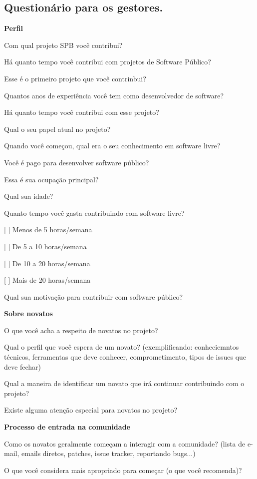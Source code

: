 \begin{anexosenv}
\chapter{Questionário para os gestores.}
\label{anexo e}

\textbf{Perfil}

Com qual projeto SPB você contribui?

Há quanto tempo você contribui com projetos de Software Público?

Esse é o primeiro projeto que você contrinbui?

Quantos anos de experiência você tem como desenvolvedor de software?

Há quanto tempo você contribui com esse projeto?

Qual o seu papel atual no projeto?

Quando você começou, qual era o seu conhecimento em software livre?

Você é pago para desenvolver software público?

Essa é sua ocupação principal?

Qual sua idade?

Quanto tempo você gasta contribuindo com software livre?

[ ] Menos de 5 horas/semana 

[ ] De 5 a 10 horas/semana

[ ] De 10 a 20 horas/semana

[ ] Mais de 20 horas/semana

Qual sua motivação para contribuir com software público?

\textbf{Sobre novatos}

O que você acha a respeito de novatos no projeto?

Qual o perfil que você espera de um novato? (exemplificando: conheciemntos técnicos, 
ferramentas que deve conhecer, comprometimento, tipos de issues que deve fechar)

Qual a maneira de identificar um novato que irá continuar contribuindo com o projeto?

Existe alguma atenção especial para novatos no projeto?

\textbf{Processo de entrada na comunidade}

Como os novatos geralmente começam a interagir com a comunidade? (lista de e-mail, 
emails diretos, patches, issue tracker, reportando bugs...)

O que você considera mais apropriado para começar (o que você recomenda)?


\end{anexosenv}
